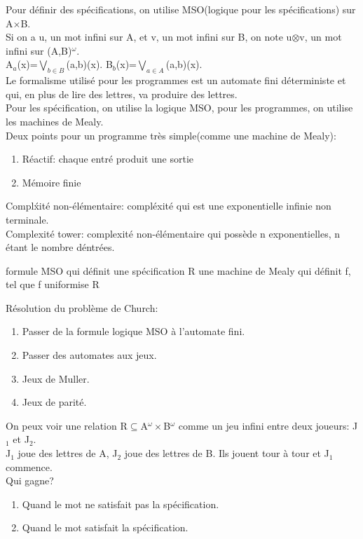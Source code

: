 Pour d\'efinir des sp\'ecifications, on utilise MSO(logique pour les sp\'ecifications) sur A$\times$B.\\
Si on a u, un mot infini sur A, et v, un mot infini sur B, on note u$\otimes$v, un mot infini sur
(A,B)$^\omega$.\\
A$_a$(x)=$\bigvee_{b\in B}$(a,b)(x). B$_b$(x)=$\bigvee_{a\in A}$(a,b)(x).\\
Le formalisme utilis\'e pour les programmes est un automate fini d\'eterministe et qui, en plus de lire des
lettres, va produire des lettres.\\
Pour les sp\'ecification, on utilise la logique MSO, pour les programmes, on utilise les machines de Mealy.\\
Deux points pour un programme tr\`es simple(comme une machine de Mealy):
\begin{enumerate}
  \item R\'eactif: chaque entr\'e produit une sortie
  \item M\'emoire finie
\end{enumerate}
\medskip
Compl\'xit\'e non-\'el\'ementaire: compl\'exit\'e qui est une exponentielle infinie non terminale.\\
Complexit\'e tower: complexit\'e non-\'el\'ementaire qui poss\`ede n exponentielles, n \'etant le nombre
d\'entr\'ees.
\begin{algorithm}
  \caption{Probl\`eme de synth\`ese de Church( compl\'exit\'e tower)}
  \begin{algorithmic}
    \REQUIRE formule MSO qui d\'efinit une sp\'ecification R
    \ENSURE une machine de Mealy qui d\'efinit f, tel que f uniformise R
  \end{algorithmic}
\end{algorithm}
R\'esolution du probl\`eme de Church:
\begin{enumerate}
  \item Passer de la formule logique MSO \`a l'automate fini.
  \item Passer des automates aux jeux.
  \item Jeux de Muller.
  \item Jeux de parit\'e.
\end{enumerate}
On peux voir une relation R$\subseteq$A$^\omega\times$B$^\omega$ comme un jeu infini entre deux joueurs: J$_1$ et
J$_2$.\\
J$_1$ joue des lettres de A, J$_2$ joue des lettres de B. Ils jouent tour \`a tour et J$_1$ commence.\\
Qui gagne?
\begin{enumerate}
  \item Quand le mot ne satisfait pas la sp\'ecification.
  \item Quand le mot satisfait la sp\'ecification.
\end{enumerate}
